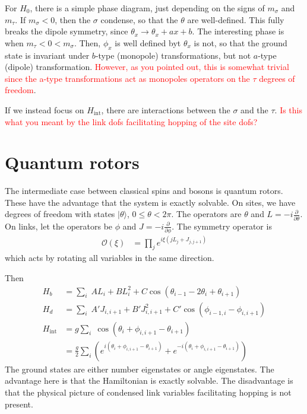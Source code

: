 \documentclass[12pt]{article}
\newcommand{\note}[1]{\textcolor{red}{#1}}
\newcommand{\nn}{\nonumber\\}
\newcommand{\goesto}{\rightarrow}
\renewcommand{\int}{\text{int}}
\begin{document}
For $H_0$, there is a simple phase diagram, just depending on the signs of $m_\sigma$ and $m_\tau$. If $m_\sigma<0$, then the $\sigma$ condense, so that the $\theta$ are well-defined. This fully breaks the dipole symmetry, since $\theta_x \goesto \theta_x + ax+b$. The interesting phase is when $m_\tau<0<m_\sigma$. Then, $\phi_x$ is well defined byt $\theta_x$ is not, so that the ground state is invariant under $b$-type (monopole) transformations, but not $a$-type (dipole) transformation. \note{However, as you pointed out, this is somewhat trivial since the a-type transformations act as monopoles operators on the $\tau$ degrees of freedom}.

If we instead focus on $H_\int$, there are interactions between the $\sigma$ and the $\tau$. \note{Is this what you meant by the link dofs facilitating hopping of the site dofs?}

\section{Quantum rotors}

The intermediate case between classical spins and bosons is quantum rotors. These have the advantage that the system is exactly solvable. On sites, we have degrees of freedom with states $|\theta\rangle$, $0\le \theta<2\pi$. The operators are $\theta$ and $L = -i\frac{\partial}{\partial\theta}$. On links, let the operators be $\phi$ and $J = -i\frac{\partial}{\partial\phi}$. The symmetry operator is 
\begin{align}
\mathcal{O}(\xi) &= \prod_je^{i\xi(jL_j+J_{j,j+1})}
\end{align}
which acts by rotating all variables in the same direction.

Then
\begin{align}
H_b &= \sum_i \; A  L_i + B L_i^2 + C \cos \left( \theta_{i-1} - 2\theta_i+\theta_{i+1} \right)\nn
H_d &= \sum_i \; A' J_{i,i+1} + B' J_{i,i+1}^2 + C' \cos \left( \phi_{i-1,i}-\phi_{i,i+1} \right) \nn
H_{\int} &= g \sum_i \; \cos \left( \theta_{i}+\phi_{i,i+1} - \theta_{i+1} \right) \nn
&= \frac{g}{2}\sum_i\left( e^{i\left( \theta_{i}+\phi_{i,i+1} - \theta_{i+1} \right)} + e^{-i\left( \theta_{i}+\phi_{i,i+1} - \theta_{i+1} \right) } \right)
\end{align}
The ground states are either number eigenstates or angle eigenstates. The advantage here is that the Hamiltonian is exactly solvable. The disadvantage is that the physical picture of condensed link variables facilitating hopping is not present.
\end{document}
